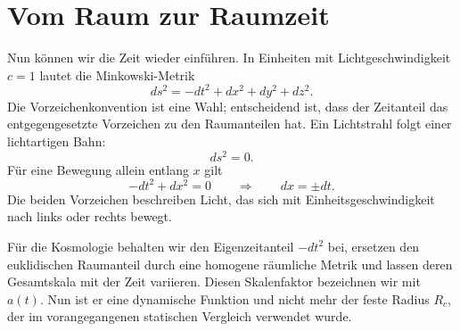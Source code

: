 \begin{classroomqa}\end{classroomqa}

\begin{classroomqa}\end{classroomqa}

\section{Vom Raum zur Raumzeit}

Nun können wir die Zeit wieder einführen. In Einheiten mit Lichtgeschwindigkeit \(c=1\) lautet die Minkowski-Metrik
\begin{equation}
ds^2 = -dt^2 + dx^2 + dy^2 + dz^2.
\label{eq:c03-minkowski}
\end{equation}
Die Vorzeichenkonvention ist eine Wahl; entscheidend ist, dass der Zeitanteil das entgegengesetzte Vorzeichen zu den Raumanteilen hat. Ein Lichtstrahl folgt einer lichtartigen Bahn:
\begin{equation}
ds^2 = 0.
\end{equation}
Für eine Bewegung allein entlang \(x\) gilt
\begin{equation}
-dt^2 + dx^2 = 0
\qquad\Rightarrow\qquad
dx = \pm dt.
\label{eq:c03-null-flat}
\end{equation}
Die beiden Vorzeichen beschreiben Licht, das sich mit Einheitsgeschwindigkeit nach links oder rechts bewegt.

Für die Kosmologie behalten wir den Eigenzeitanteil \(-dt^2\) bei, ersetzen den euklidischen Raumanteil durch eine homogene räumliche Metrik und lassen deren Gesamtskala mit der Zeit variieren. Diesen Skalenfaktor bezeichnen wir mit \(a(t)\). Nun ist er eine dynamische Funktion und nicht mehr der feste Radius \(R_c\), der im vorangegangenen statischen Vergleich verwendet wurde.

